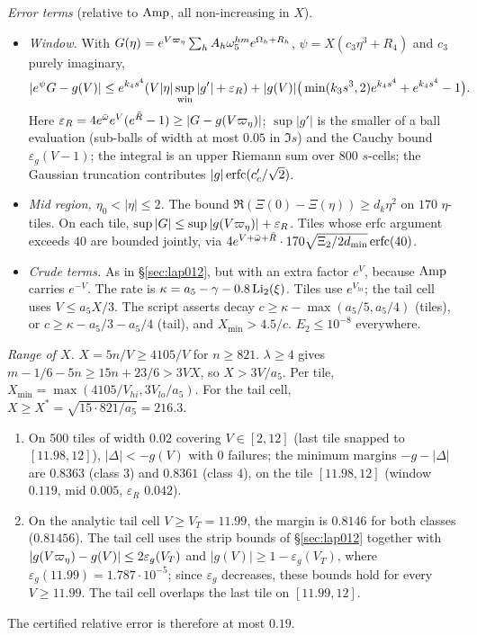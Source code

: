 \emph{Error terms} (relative to $\operatorname{Amp}$, all non-increasing in $X$).
\begin{itemize}
\item \emph{Window.} With $G(\eta)=e^{V\varpi_\eta}\sum_hA_h\omega_5^{hm}e^{\Omega_h+R_h}$, $\psi=X(c_3\eta^3+R_4)$ and $c_3$
purely imaginary,
\[
|e^\psi G-g(V)|\le e^{k_4s^4}(V|\eta|\sup_{\rm win}|g'|+\varepsilon_R)+|g(V)|\big(\min(k_3s^3,2)e^{k_4s^4}+e^{k_4s^4}-1\big).
\]
Here $\varepsilon_R=4e^{\bar\omega}e^V(e^{\bar R}-1)\ge|G-g(V\varpi_\eta)|$; $\sup|g'|$ is the smaller of a ball evaluation
(sub-balls of width at most $0.05$ in $\Im s$) and the Cauchy bound $\varepsilon_g(V-1)$; the integral is an upper Riemann
sum over $800$ $s$-cells; the Gaussian truncation contributes $|g|\operatorname{erfc}(c_c'/\sqrt2)$.
\item \emph{Mid region, $\eta_0<|\eta|\le2$.} The bound $\Re(\Xi(0)-\Xi(\eta))\ge d_k\eta^2$ on $170$ $\eta$-tiles. On each
tile, $\sup|G|\le\sup|g(V\varpi_\eta)|+\varepsilon_R$. Tiles whose erfc argument exceeds $40$ are bounded jointly, via
$4e^{V+\bar\omega+\bar R}\cdot170\sqrt{\Xi_2/2d_{\min}}\operatorname{erfc}(40)$.
\item \emph{Crude terms.} As in \S\ref{sec:lap012}, but with an extra factor $e^V$, because $\operatorname{Amp}$ carries $e^{-V}$. The rate
is $\kappa=a_5-\gamma-0.8\operatorname{Li}_2(\xi)$. Tiles use $e^{V_{hi}}$; the tail cell uses $V\le a_5X/3$. The script asserts decay
$c\ge\kappa-\max(a_5/5,a_5/4)$ (tiles), or $c\ge\kappa-a_5/3-a_5/4$ (tail), and $X_{\min}>4.5/c$. $E_2\le10^{-8}$
everywhere.
\end{itemize}

\emph{Range of $X$.} $X=5n/V\ge4105/V$ for $n\ge821$. $\lambda\ge4$ gives $m-1/6-5n\ge15n+23/6>3VX$, so $X>3V/a_5$. Per
tile, $X_{\min}=\max(4105/V_{hi},3V_{lo}/a_5)$. For the tail cell, $X\ge X^*=\sqrt{15\cdot821/a_5}=216.3$.

\begin{lemma}[classes $3$--$4$]\label{lem:lap34}
\begin{enumerate}
\item On $500$ tiles of width $0.02$ covering $V\in[2,12]$ (last tile snapped to $[11.98,12]$), $|\Delta|<-g(V)$ with $0$
failures; the minimum margins $-g-|\Delta|$ are $0.8363$ (class $3$) and $0.8361$ (class $4$), on the tile $[11.98,12]$
(window $0.119$, mid $0.005$, $\varepsilon_R$ $0.042$).
\item On the analytic tail cell $V\ge V_T=11.99$, the margin is $0.8146$ for both classes ($0.81456$). The tail cell uses the
strip bounds of \S\ref{sec:lap012} together with $|g(V\varpi_\eta)-g(V)|\le2\varepsilon_g(V_T)$ and
$|g(V)|\ge1-\varepsilon_g(V_T)$, where $\varepsilon_g(11.99)=1.787\cdot10^{-5}$; since $\varepsilon_g$ decreases, these
bounds hold for every $V\ge11.99$. The tail cell overlaps the last tile on $[11.99,12]$.
\end{enumerate}
The certified relative error is therefore at most $0.19$.
\end{lemma}


